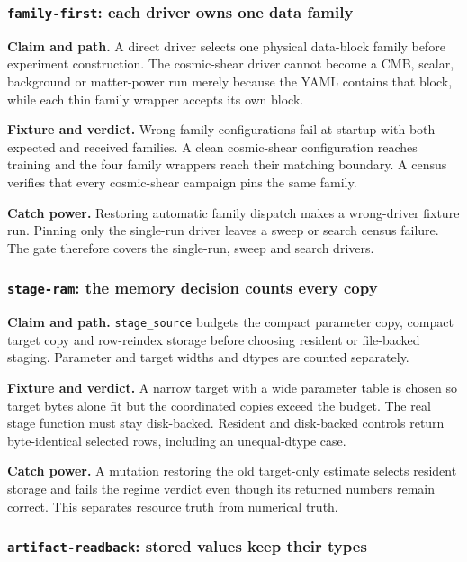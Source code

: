 \documentclass[10pt,aps,prd,twocolumn,nofootinbib]{revtex4-2}
\newcommand{\code}[1]{\texttt{#1}}
\begin{document}
\subsubsection{\code{family-first}: each driver owns one data family}

\textbf{Claim and path.}  A direct driver selects one physical data-block
family before experiment construction.  The cosmic-shear driver cannot
become a CMB, scalar, background or matter-power run merely because the YAML
contains that block, while each thin family wrapper accepts its own block.

\textbf{Fixture and verdict.}  Wrong-family configurations fail at startup
with both expected and received families.  A clean cosmic-shear configuration
reaches training and the four family wrappers reach their matching boundary.
A census verifies that every cosmic-shear campaign pins the same family.

\textbf{Catch power.}  Restoring automatic family dispatch makes a
wrong-driver fixture run.  Pinning only the single-run driver leaves a sweep
or search census failure.  The gate therefore covers the single-run, sweep
and search drivers.

\subsubsection{\code{stage-ram}: the memory decision counts every copy}

\textbf{Claim and path.}  \code{stage\_source} budgets the compact parameter
copy, compact target copy and row-reindex storage before choosing resident or
file-backed staging.  Parameter and target widths and dtypes are counted
separately.

\textbf{Fixture and verdict.}  A narrow target with a wide parameter table is
chosen so target bytes alone fit but the coordinated copies exceed the
budget.  The real stage function must stay disk-backed.  Resident and
disk-backed controls return byte-identical selected rows, including an
unequal-dtype case.

\textbf{Catch power.}  A mutation restoring the old target-only estimate
selects resident storage and fails the regime verdict even though its returned
numbers remain correct.  This separates resource truth from numerical truth.

\subsubsection{\code{artifact-readback}: stored values keep their types}
\end{document}
